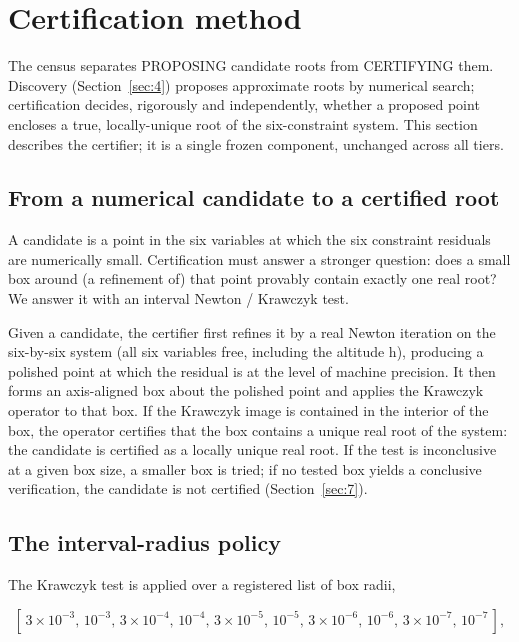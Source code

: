 \documentclass[pdflatex,sn-mathphys-num]{sn-jnl}
\begin{document}
\section{Certification method}\label{sec:3}

The census separates PROPOSING candidate roots from CERTIFYING them. Discovery (Section~\ref{sec:4}) proposes approximate roots by numerical search; certification decides, rigorously and independently, whether a proposed point encloses a true, locally-unique root of the six-constraint system. This section
describes the certifier; it is a single frozen component, unchanged across all tiers.

\subsection{From a numerical candidate to a certified root}\label{sec:3.1}

A candidate is a point in the six variables at which the six constraint residuals are numerically small. Certification must answer a stronger question: does a small box around (a refinement of) that point provably contain exactly one real root? We answer it with an interval Newton / Krawczyk test.

Given a candidate, the certifier first refines it by a real Newton iteration on the six-by-six system (all six variables free, including the altitude h), producing a polished point at which the residual is at the level of machine precision. It then forms an axis-aligned box about the polished point and
applies the Krawczyk operator to that box. If the Krawczyk image is contained in the interior of the box, the operator certifies that the box contains a unique real root of the system: the candidate is certified as a locally unique real root. If the test is inconclusive at a given box size, a smaller box is tried; if no tested box yields a conclusive verification, the candidate is not certified (Section~\ref{sec:7}).

\subsection{The interval-radius policy}\label{sec:3.2}

The Krawczyk test is applied over a registered list of box radii,

\[ [\,3\times10^{-3},\,10^{-3},\,3\times10^{-4},\,10^{-4},\,3\times10^{-5},\,10^{-5},\,3\times10^{-6},\,10^{-6},\,3\times10^{-7},\,10^{-7}\,], \]
\end{document}
